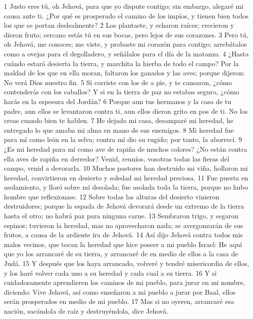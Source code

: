 1 Justo eres tú, oh Jehová, para que yo dispute contigo; sin embargo, alegaré mi causa ante ti. ¿Por qué es prosperado el camino de los impíos, y tienen bien todos los que se portan deslealmente?
2 Los plantaste, y echaron raíces; crecieron y dieron fruto; cercano estás tú en sus bocas, pero lejos de sus corazones.
3 Pero tú, oh Jehová, me conoces; me viste, y probaste mi corazón para contigo; arrebátalos como a ovejas para el degolladero, y señálalos para el día de la matanza.
4 ¿Hasta cuándo estará desierta la tierra, y marchita la hierba de todo el campo? Por la maldad de los que en ella moran, faltaron los ganados y las aves; porque dijeron: No verá Dios nuestro fin.
5 Si corriste con los de a pie, y te cansaron, ¿cómo contenderás con los caballos? Y si en la tierra de paz no estabas seguro, ¿cómo harás en la espesura del Jordán?
6 Porque aun tus hermanos y la casa de tu padre, aun ellos se levantaron contra ti, aun ellos dieron grito en pos de ti. No los creas cuando bien te hablen.
7 He dejado mi casa, desamparé mi heredad, he entregado lo que amaba mi alma en mano de sus enemigos.
8 Mi heredad fue para mí como león en la selva; contra mí dio su rugido; por tanto, la aborrecí.
9 ¿Es mi heredad para mí como ave de rapiña de muchos colores? ¿No están contra ella aves de rapiña en derredor? Venid, reuníos, vosotras todas las fieras del campo, venid a devorarla.
10 Muchos pastores han destruido mi viña, hollaron mi heredad, convirtieron en desierto y soledad mi heredad preciosa.
11 Fue puesta en asolamiento, y lloró sobre mí desolada; fue asolada toda la tierra, porque no hubo hombre que reflexionase.
12 Sobre todas las alturas del desierto vinieron destruidores; porque la espada de Jehová devorará desde un extremo de la tierra hasta el otro; no habrá paz para ninguna carne.
13 Sembraron trigo, y segaron espinos; tuvieron la heredad, mas no aprovecharon nada; se avergonzarán de sus frutos, a causa de la ardiente ira de Jehová.
14 Así dijo Jehová contra todos mis malos vecinos, que tocan la heredad que hice poseer a mi pueblo Israel: He aquí que yo los arrancaré de su tierra, y arrancaré de en medio de ellos a la casa de Judá.
15 Y después que los haya arrancado, volveré y tendré misericordia de ellos, y los haré volver cada uno a su heredad y cada cual a su tierra.
16 Y si cuidadosamente aprendieren los caminos de mi pueblo, para jurar en mi nombre, diciendo: Vive Jehová, así como enseñaron a mi pueblo a jurar por Baal, ellos serán prosperados en medio de mi pueblo.
17 Mas si no oyeren, arrancaré esa nación, sacándola de raíz y destruyéndola, dice Jehová.


